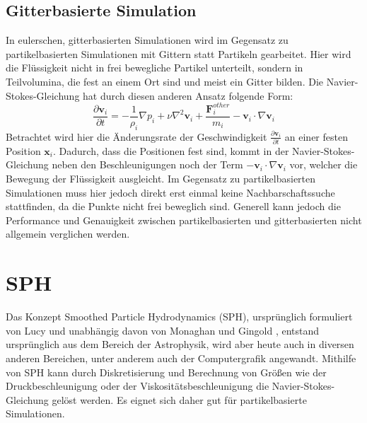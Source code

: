 \documentclass{scrreprt}
\begin{document}
\subsection{Gitterbasierte Simulation}
In eulerschen, gitterbasierten Simulationen wird im Gegensatz zu partikelbasierten Simulationen mit Gittern statt Partikeln gearbeitet.
Hier wird die Flüssigkeit nicht in frei bewegliche Partikel unterteilt, sondern in Teilvolumina, die fest an einem Ort sind und meist ein Gitter bilden.
Die Navier-Stokes-Gleichung hat durch diesen anderen Ansatz folgende Form:
\begin{equation}
    \frac{\partial\textbf{v}_i}{\partial t} = -\frac{1}{\rho_i} \nabla p_i + \nu \nabla^2 \textbf{v}_i + \frac{\textbf{F}_i^{other}}{m_i} - \textbf{v}_i \cdot \nabla \textbf{v}_i
\end{equation}
Betrachtet wird hier die Änderungsrate der Geschwindigkeit $\frac{\partial\textbf{v}_i}{\partial t}$ an einer festen Position $\textbf{x}_i$.
Dadurch, dass die Positionen fest sind,
kommt in der Navier-Stokes-Gleichung neben den Beschleunigungen noch der Term $- \textbf{v}_i \cdot \nabla \textbf{v}_i$ vor,
welcher die Bewegung der Flüssigkeit ausgleicht.
Im Gegensatz zu partikelbasierten Simulationen muss hier jedoch direkt erst einmal keine Nachbarschaftssuche stattfinden,
da die Punkte nicht frei beweglich sind.
Generell kann jedoch die Performance und Genauigkeit zwischen partikelbasierten und gitterbasierten nicht allgemein verglichen werden.


\section{SPH}
Das Konzept Smoothed Particle Hydrodynamics (SPH),
ursprünglich formuliert von Lucy \cite{lucy_numerical_1977} und unabhängig davon von Monaghan und Gingold \cite{gingold_smoothed_1977},
entstand ursprünglich aus dem Bereich der Astrophysik, wird aber heute auch in diversen anderen Bereichen,
unter anderem auch der Computergrafik angewandt.
Mithilfe von SPH kann durch Diskretisierung und Berechnung von Größen wie der Druckbeschleunigung oder der Viskositätsbeschleunigung
die Navier-Stokes-Gleichung gelöst werden.
Es eignet sich daher gut für partikelbasierte Simulationen.
\end{document}
